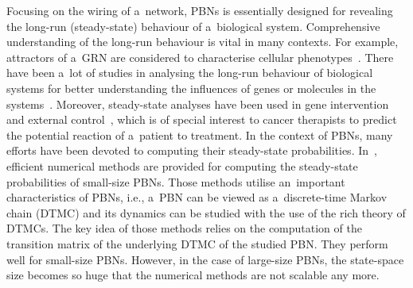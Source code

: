 \documentclass[runningheads,a4paper]{llncs}
\begin{document}
Focusing on the wiring of a~network, PBNs is essentially designed for revealing the long-run
(steady-state) behaviour of a~biological system. Comprehensive understanding of the long-run
behaviour is vital in many contexts. For example, attractors of a~GRN
are considered to characterise cellular phenotypes~\cite{Kauffman69a}.
There have been a~lot of studies in analysing the long-run behaviour of biological systems for
better understanding the influences of genes or molecules in the systems~\cite{SDZ02}.
Moreover, steady-state analyses have been used in gene intervention and external
control~\cite{SDZ02Gene,ADZ02}, which is of special interest to cancer therapists to predict the
potential reaction of a~patient to treatment. In the context of PBNs, many efforts have been
devoted to computing their steady-state probabilities.
In~\cite{SGH03,TMPTS14}, efficient numerical methods are provided for computing the steady-state
probabilities of small-size PBNs. Those methods utilise an~important characteristics of PBNs,
i.e., a~PBN can be viewed as a~discrete-time Markov chain (DTMC) and its dynamics can be studied
with the use of the rich theory of DTMCs. The key idea of those methods relies on the computation
of the transition matrix of the underlying DTMC of the studied PBN. They perform well for
small-size PBNs. However, in the case of large-size PBNs, the state-space size becomes so huge
that the numerical methods are not scalable any more.
\end{document}
